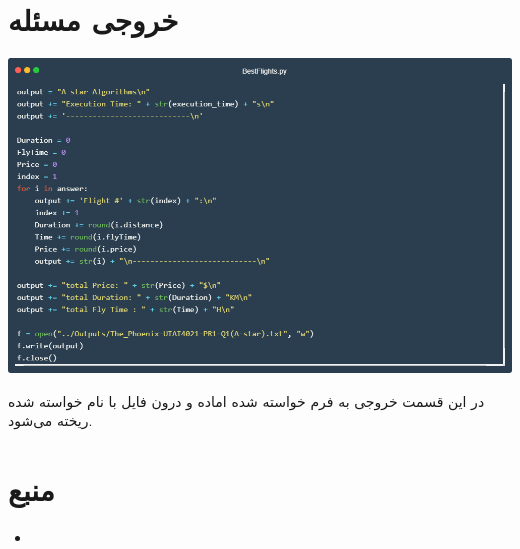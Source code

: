 \documentclass[12pt, dvipsnames, svgnames, x11names,]{article}
\begin{document}
	\section{خروجی مسئله} \label{output}

		{\includegraphics[width=14cm]{images/code12}} \par
		{\normalsize 
		در این قسمت خروجی به فرم خواسته شده اماده و درون فایل با نام خواسته شده ریخته می‌شود.
		}



	\section{منبع} \label{resource}
	
		\begin{itemize}
			
			\item 
			\textbf{}

			
		\end{itemize}

		
	
\end{document}

